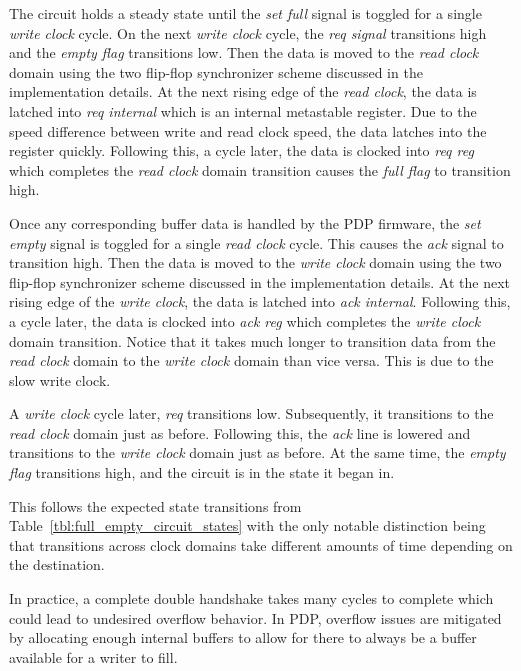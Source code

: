         The circuit holds a steady state until the {\it set full} signal is toggled for a single {\it write clock} cycle. On the next {\it write clock} cycle, the {\it req signal} transitions high and the {\it empty flag} transitions low. Then the data is moved to the {\it read clock} domain using the two flip-flop synchronizer scheme discussed in the implementation details. At the next rising edge of the {\it read clock}, the data is latched into {\it req internal} which is an internal metastable register. Due to the speed difference between write and read clock speed, the data latches into the register quickly. Following this, a cycle later, the data is clocked into {\it req reg} which completes the {\it read clock} domain transition causes the {\it full flag} to transition high.

        Once any corresponding buffer data is handled by the PDP firmware, the {\it set empty} signal is toggled for a single {\it read clock} cycle. This causes the {\it ack} signal to transition high. Then the data is moved to the {\it write clock} domain using the two flip-flop synchronizer scheme discussed in the implementation details. At the next rising edge of the {\it write clock}, the data is latched into {\it ack internal}. Following this, a cycle later, the data is clocked into {\it ack reg} which completes the {\it write clock} domain transition. Notice that it takes much longer to transition data from the {\it read clock} domain to the {\it write clock} domain than vice versa. This is due to the slow write clock.

        A {\it write clock} cycle later, {\it req} transitions low. Subsequently, it transitions to the {\it read clock} domain just as before. Following this, the {\it ack} line is lowered and transitions to the {\it write clock} domain just as before. At the same time, the {\it empty flag} transitions high, and the circuit is in the state it began in.

        This follows the expected state transitions from Table~\ref{tbl:full_empty_circuit_states} with the only notable distinction being that transitions across clock domains take different amounts of time depending on the destination.

        In practice, a complete double handshake takes many cycles to complete which could lead to undesired overflow behavior. In PDP, overflow issues are mitigated by allocating enough internal buffers to allow for there to always be a buffer available for a writer to fill.

